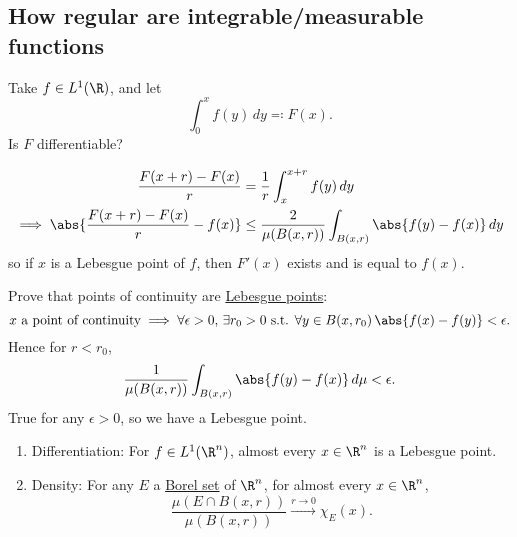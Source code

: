 \documentclass[twoside]{article}
\begin{document}
\clearpage
\subsection{How regular are integrable/measurable functions}
Take $f \in L^1(\R)$, and let
\begin{equation*}
    \int_0^x f(y) \, dy \eqqcolon F(x).
\end{equation*}
Is $F$ differentiable?
\begin{remark}
    \begin{align*}
        \frac{F(x+r)-F(x)}{r} &= \frac{1}{r} \int_x^{x+r} f(y) \, dy \\
        \implies \abs{\frac{F(x+r)-F(x)}{r} - f(x)} &\leq \frac{2}{\mu(B(x,r))} \int_{B(x,r)} \abs{f(y) - f(x)} \, dy
    \end{align*}
    so if $x$ is a Lebesgue point of $f$, then $F'(x)$ exists and is equal to $f(x)$.
\end{remark}
\begin{ex}
    Prove that points of continuity are \hyperlink{def:lebPoint}{Lebesgue points}:
    \begin{equation*}
        x \text{ a point of continuity} \implies \forall \epsilon > 0, \, \exists r_0 > 0 \text{ s.t. } \forall y \in B(x, r_0) \, \abs{f(x) - f(y)} < \epsilon.
    \end{equation*}
    Hence for $r < r_0$,
    \begin{equation*}
        \frac{1}{\mu(B(x, r))} \int_{B(x,r)} \abs{f(y) - f(x)} \, d\mu < \epsilon.
    \end{equation*}
    True for any $\epsilon>0$, so we have a Lebesgue point.
\end{ex}
\begin{thm}\leavevmode
    \begin{enumerate}[label=(\arabic*)]
        \item Differentiation: For $f \in L^1(\R^n)$, almost every $x \in \R^n$ is a Lebesgue point.
        \item Density: For any $E$ a \hyperlink{def:borelSet}{Borel set} of $\R^n$, for almost every $x \in \R^n$,
            \begin{equation*}
                \frac{\mu(E \cap B(x, r))}{\mu(B(x, r))} \xrightarrow{r \to 0} \chi_E(x). \label{1.4star} \tag{$*$}
            \end{equation*}
    \end{enumerate}
\end{thm}
\end{document}
